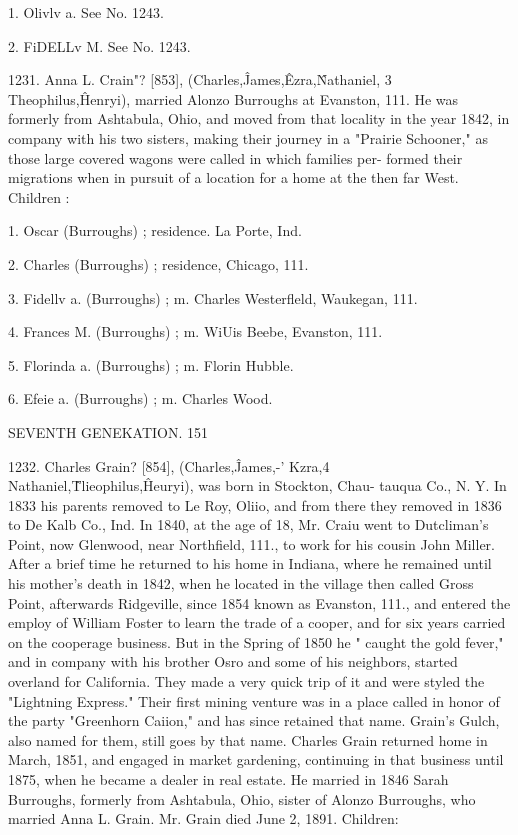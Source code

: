 \documentclass{book}
\begin{document}
1. Olivlv a. See No. 1243. 

2. FiDELLv M. See No. 1243. 

1231. Anna L. Crain"? [853], (Charles,\^ James,\^ Ezra,\^ 
Nathaniel, 3 Theophilus,\^ Henryi), married Alonzo Burroughs at 
Evanston, 111. He was formerly from Ashtabula, Ohio, and 
moved from that locality in the year 1842, in company with his 
two sisters, making their journey in a "Prairie Schooner," as 
those large covered wagons were called in which families per- 
formed their migrations when in pursuit of a location for a home 
at the then far West. Children : 

1. Oscar (Burroughs) ; residence. La Porte, Ind. 

2. Charles (Burroughs) ; residence, Chicago, 111. 

3. Fidellv a. (Burroughs) ; m. Charles Westerfleld, Waukegan, 111. 

4. Frances M. (Burroughs) ; m. WiUis Beebe, Evanston, 111. 

5. Florinda a. (Burroughs) ; m. Florin Hubble. 

6. Efeie a. (Burroughs) ; m. Charles Wood. 



SEVENTH GENEKATION. 151 

1232. Charles Grain? [854], (Charles,\^ James,-' Kzra,4 
Nathaniel,\^ Tlieophilus,\^ Heuryi), was born in Stockton, Chau- 
tauqua Co., N. Y. In 1833 his parents removed to Le Roy, Oliio, 
and from there they removed in 1836 to De Kalb Co., Ind. In 
1840, at the age of 18, Mr. Craiu went to Dutcliman's Point, now 
Glenwood, near Northfield, 111., to work for his cousin John Miller. 
After a brief time he returned to his home in Indiana, where he 
remained until his mother's death in 1842, when he located in the 
village then called Gross Point, afterwards Ridgeville, since 1854 
known as Evanston, 111., and entered the employ of William 
Foster to learn the trade of a cooper, and for six years carried 
on the cooperage business. But in the Spring of 1850 he " caught 
the gold fever," and in company with his brother Osro and some 
of his neighbors, started overland for California. They made a 
very quick trip of it and were styled the "Lightning Express." 
Their first mining venture was in a place called in honor of the 
party "Greenhorn Caiion," and has since retained that name. 
Grain's Gulch, also named for them, still goes by that name. 
Charles Grain returned home in March, 1851, and engaged in 
market gardening, continuing in that business until 1875, when 
he became a dealer in real estate. He married in 1846 Sarah 
Burroughs, formerly from Ashtabula, Ohio, sister of Alonzo 
Burroughs, who married Anna L. Grain. Mr. Grain died June 
2, 1891. Children: 
\end{document}
